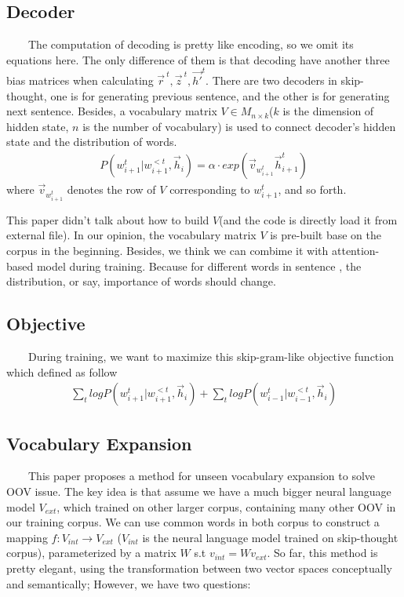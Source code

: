 \documentclass{article}
\begin{document}
\subsection{Decoder}
\par~~~~The computation of decoding is pretty like encoding, so we omit its equations here. The only difference of them is that decoding have another three bias matrices when calculating $\vec{r}^{\ t},\vec{z}^{\ t},\vec{h'}^{t}$. There are two decoders in skip-thought, one is for generating previous sentence, and the other is for generating next sentence. Besides, a vocabulary matrix $V \in M_{n \times k}$($k$ is the dimension of hidden state, $n$ is the number of vocabulary) is used to connect decoder's hidden state and the distribution of words.
	\begin{align}
	P(w_{i+1}^t | w_{i+1}^{<t},\vec{h}_i) = \alpha \cdot exp(\vec{v}_{w_{i+1}^t}\vec{h}_{i+1}^{t})
	\end{align}
where $\vec{v}_{w_{i+1}^t}$ denotes the row of $V$ corresponding to $w_{i+1}^t$, and so forth.
\newline

\par This paper didn't talk about how to build $V$(and the code is directly load it from external file). In our opinion, the vocabulary matrix $V$ is pre-built base on the corpus in the beginning. Besides, we think we can combime it with attention-based model during training. Because for different words in sentence , the distribution, or say, importance of words should change.

\subsection{Objective}
\par ~~~~During training, we want to maximize this skip-gram-like objective function which defined as follow
	\begin{align}
	\sum\limits_{t} logP(w_{i+1}^t | w_{i+1}^{<t},\vec{h}_i) + \sum\limits_{t} logP(w_{i-1}^t | w_{i-1}^{<t},\vec{h}_i)
\end{align}

\subsection{Vocabulary Expansion}
\par~~~~This paper proposes a method for unseen vocabulary expansion to solve OOV issue. The key idea is that assume we have a much bigger neural language model $V_{ext}$, which trained on other larger corpus, containing many other OOV in our training corpus. We can use common words in both corpus to construct a mapping $f : V_{int} \to V_{ext}$ ($V_{int}$ is the neural language model trained on skip-thought corpus), 
parameterized by a matrix $W$ s.t $v_{int} = Wv_{ext}$. So far, this method is pretty elegant, using the transformation between two vector spaces conceptually and semantically; However, we have two questions:
\newline
\end{document}
